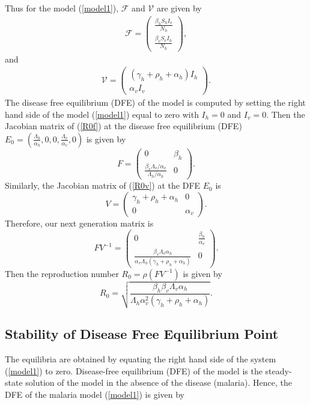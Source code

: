 \documentclass[review]{elsarticle}
\begin{document}
Thus for the model (\ref{model1}), $\mathscr{F}$ and $\mathscr{V}$ are given by
\begin{align}\label{R0f}
\mathscr{F}=
\begin{pmatrix}
\frac{\beta_h S_hI_v}{N_h}\\
\frac{\beta_v S_vI_h}{N_h}
\end{pmatrix},
\end{align}
and
\begin{align}\label{R0v}
\mathscr{V}=
\begin{pmatrix}
(\gamma_h +\rho_h +\alpha_h )I_h\\
\alpha_v I_v
\end{pmatrix}.
\end{align}
The disease free equilibrium (DFE) of the model is computed by setting the right hand side of the model (\ref{model1}) equal to zero with $I_h=0$ and $I_v=0$. Then the Jacobian matrix of (\ref{R0f}) at the disease free equilibrium (DFE) $E_0=\left(\frac{\Lambda_h}{\alpha_h},0,0,\frac{\Lambda_v}{\alpha_v},0\right)$ is given by
\[
F=
\begin{pmatrix}
0 & \beta_h\\
\frac{\beta_v \Lambda_v/\alpha_v}{\Lambda_h/\alpha_h} &0
\end{pmatrix}.
\]
Similarly, the Jacobian matrix of (\ref{R0v}) at the DFE $E_0$ is
\[
V=
\begin{pmatrix}
\gamma_h +\rho_h +\alpha_h & 0\\
0 & \alpha_v
\end{pmatrix}.
\]
Therefore, our next generation matrix is
\[
FV^{-1}=
\begin{pmatrix}
0 & \frac{\beta_h}{\alpha_v}\\
\frac{\beta_v\Lambda_v\alpha_h}{\alpha_v\Lambda_h(\gamma_h +\rho_h +\alpha_h)} & 0
\end{pmatrix}.
\]
Then the reproduction number $R_0=\rho(FV^{-1})$ is given by
\[
R_0=\sqrt{\frac{\beta_h\beta_v\Lambda_v\alpha_h}{\Lambda_h\alpha_v^2(\gamma_h +\rho_h +\alpha_h)}}.
\]
\subsection{Stability of Disease Free Equilibrium Point}

 The equilibria are obtained by equating the right hand side of the system (\ref{model1}) to zero. Disease-free equilibrium (DFE) of the model is the steady-state solution of the model in the absence of the disease (malaria). Hence, the DFE of the malaria model (\ref{model1}) is given by
\end{document}
